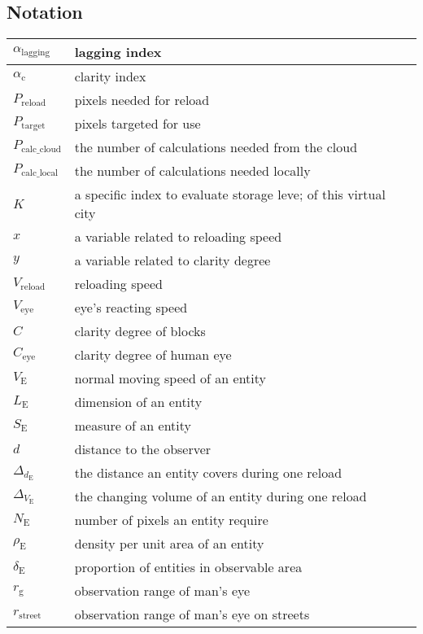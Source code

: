 \documentclass[12pt]{article}
\theoremstyle{definition}
\theoremstyle{remark}
\numberwithin{equation}{section}
\begin{document}
	\subsection{Notation}
		\begin{tabular}{|l|l|}
			\hline
			$\alpha_\mathrm{lagging}$&lagging index\\
			\hline
			$\alpha_\mathrm{c}$&clarity index\\
			\hline
			$P_\mathrm{reload}$&pixels needed for reload\\
			\hline
			$P_\mathrm{target}$&pixels targeted for use\\
			\hline
			$P_\mathrm{calc\_cloud}$&the number of calculations needed from the cloud\\
			\hline
			$P_\mathrm{calc\_local}$&the number of calculations needed locally\\
			\hline
			$K$&a specific index to evaluate storage leve; of this virtual city\\
			\hline
			$x$&a variable related to reloading speed\\
			\hline
			$y$&a variable related to clarity degree\\
			\hline
			$V_\mathrm{reload}$&reloading speed\\
			\hline
			$V_\mathrm{eye}$&eye's reacting speed\\
			\hline
			$C$&clarity degree of blocks\\
			\hline
			$C_\mathrm{eye}$&clarity degree of human eye\\
			\hline
			$V_\mathrm{E}$&normal moving speed of an entity\\
			\hline
			$L_\mathrm{E}$&dimension of an entity\\
			\hline
			$S_\mathrm{E}$&measure of an entity\\
			\hline
			$d$&distance to the observer\\
			\hline
			$\Delta_{d_\mathrm{E}}$&the distance an entity covers during one reload\\
			\hline
			$\Delta_{V_\mathrm{E}}$&the changing volume of an entity during one reload\\
			\hline
			$N_\mathrm{E}$&number of pixels an entity require\\
			\hline
			$\rho_\mathrm{E}$&density per unit area of an entity\\
			\hline
			$\delta_\mathrm{E}$&proportion of entities in observable area\\
			\hline
			$r_\mathrm{g}$&observation range of man's eye\\
			\hline
			$r_\mathrm{street}$&observation range of man's eye on streets\\
			\hline
		\end{tabular}
\end{document}
